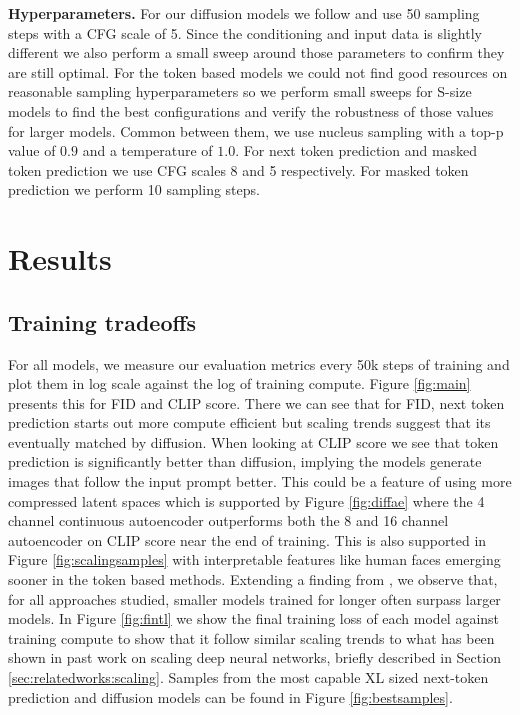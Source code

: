 \textbf{Hyperparameters.} For our diffusion models we follow \cite{esser2024scaling} and use 50 sampling steps with a CFG scale of 5. Since the conditioning and input data is slightly different we also perform a small sweep around those parameters to confirm they are still optimal. For the token based models we could not find good resources on reasonable sampling hyperparameters so we perform small sweeps for S-size models to find the best configurations and verify the robustness of those values for larger models. Common between them, we use nucleus sampling \citep{holtzman2020curious} with a top-p value of $0.9$ and a temperature of $1.0$. For next token prediction and masked token prediction we use CFG scales 8 and 5 respectively. For masked token prediction we perform 10 sampling steps.\section{Results}
\label{sec:results}
\subsection{Training tradeoffs}

For all models, we measure our evaluation metrics every 50k steps of training and plot them in log scale against the log of training compute. Figure \ref{fig:main} presents this for FID and CLIP score. There we can see that for FID, next token prediction starts out more compute efficient but scaling trends suggest that its eventually matched by diffusion. When looking at CLIP score we see that token prediction is significantly better than diffusion, implying the models generate images that follow the input prompt better. This could be a feature of using more compressed latent spaces which is supported by Figure \ref{fig:diffae} where the 4 channel continuous autoencoder outperforms both the 8 and 16 channel autoencoder on CLIP score near the end of training.  This is also supported in Figure \ref{fig:scalingsamples} with interpretable features like human faces emerging sooner in the token based methods. Extending a finding from \cite{mei2024bigger}, we observe that, for all approaches studied, smaller models trained for longer often surpass larger models. In Figure \ref{fig:fintl} we show the final training loss of each model against training compute to show that it follow similar scaling trends to what has been shown in past work on scaling deep neural networks, briefly described in Section \ref{sec:relatedworks:scaling}. Samples from the most capable XL sized next-token prediction and diffusion models can be found in Figure \ref{fig:bestsamples}.

